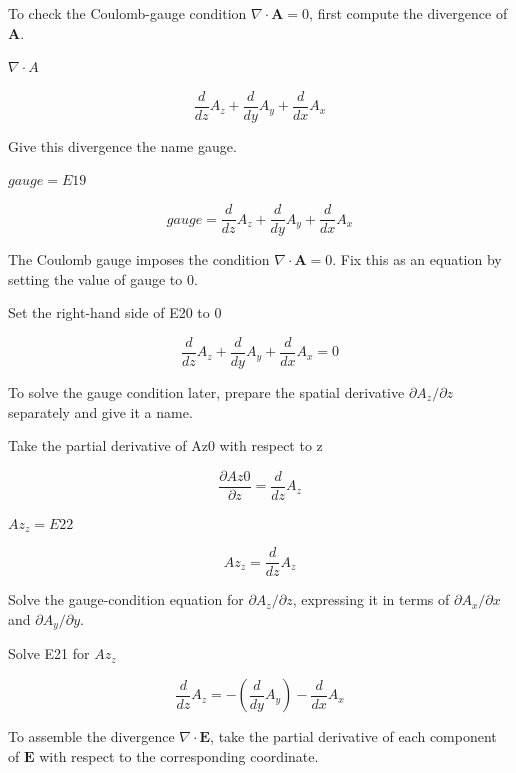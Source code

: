 \documentclass[dvipdfmx]{article}
\begin{document}
To check the Coulomb-gauge condition $\nabla\cdot\mathbf A=0$, first compute the divergence of $\mathbf A$.

$\nabla \cdot A$

\begin{equation}
  \frac{d}{d z} A_{z}+\frac{d}{d y} A_{y}+\frac{d}{d x} A_{x}
  \label{eq:E19}
\end{equation}

Give this divergence the name gauge.

$gauge = E19$

\begin{equation}
  gauge = \frac{d}{d z} A_{z}+\frac{d}{d y} A_{y}+\frac{d}{d x} A_{x}
  \label{eq:E20}
\end{equation}

The Coulomb gauge imposes the condition $\nabla\cdot\mathbf A=0$. Fix this as an equation by setting the value of gauge to 0.

Set the right-hand side of E20 to 0

\begin{equation}
  \frac{d}{d z} A_{z}+\frac{d}{d y} A_{y}+\frac{d}{d x} A_{x} = 0
  \label{eq:E21}
\end{equation}

To solve the gauge condition later, prepare the spatial derivative $\partial A_z/\partial z$ separately and give it a name.

Take the partial derivative of Az0 with respect to z

\begin{equation}
  \frac{\partial Az0}{\partial z} = \frac{d}{d z} A_{z}
  \label{eq:E22}
\end{equation}

$Az_z = E22$

\begin{equation}
  Az_z = \frac{d}{d z} A_{z}
  \label{eq:E23}
\end{equation}

Solve the gauge-condition equation for $\partial A_z/\partial z$, expressing it in terms of $\partial A_x/\partial x$ and $\partial A_y/\partial y$.

Solve E21 for $Az_z$

\begin{equation}
  \frac{d}{d z} A_{z} = -\left(\frac{d}{d y} A_{y}\right)-\frac{d}{d x} A_{x}
  \label{eq:E24}
\end{equation}

To assemble the divergence $\nabla\cdot\mathbf E$, take the partial derivative of each component of $\mathbf E$ with respect to the corresponding coordinate.
\end{document}
